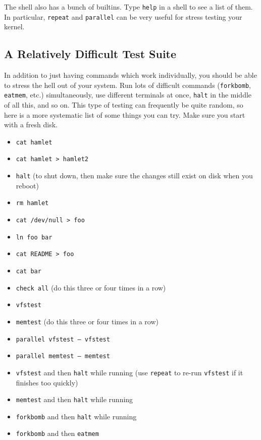 The shell also has a bunch of builtins. Type \texttt{help} in a shell to see a list of them. In particular, \texttt{repeat} and \texttt{parallel} can be very useful for stress testing your kernel.

\subsection{A Relatively Difficult Test Suite}

In addition to just having commands which work individually, you should be able to stress the hell out of your system. Run lots of difficult commands (\texttt{forkbomb}, \texttt{eatmem}, etc.) simultaneously, use different terminals at once, \texttt{halt} in the middle of all this, and so on. This type of testing can frequently be quite random, so here is a more systematic list of some things you can try. Make sure you start with a fresh disk.

\begin{itemize}
    \item \texttt{cat hamlet}
    \item \texttt{cat hamlet > hamlet2}
    \item \texttt{halt} (to shut down, then make sure the changes still exist on disk when you reboot)
    \item \texttt{rm hamlet}
    \item \texttt{cat /dev/null > foo}
    \item \texttt{ln foo bar}
    \item \texttt{cat README > foo}
    \item \texttt{cat bar}
    \item \texttt{check all} (do this three or four times in a row)
    \item \texttt{vfstest}
    \item \texttt{memtest} (do this three or four times in a row)
    \item \texttt{parallel vfstest -- vfstest}
    \item \texttt{parallel memtest -- memtest}
    \item \texttt{vfstest} and then \texttt{halt} while running (use \texttt{repeat} to re-run \texttt{vfstest} if it finishes too quickly)
    \item \texttt{memtest} and then \texttt{halt} while running
    \item \texttt{forkbomb} and then \texttt{halt} while running
    \item \texttt{forkbomb} and then \texttt{eatmem}
\end{itemize}

